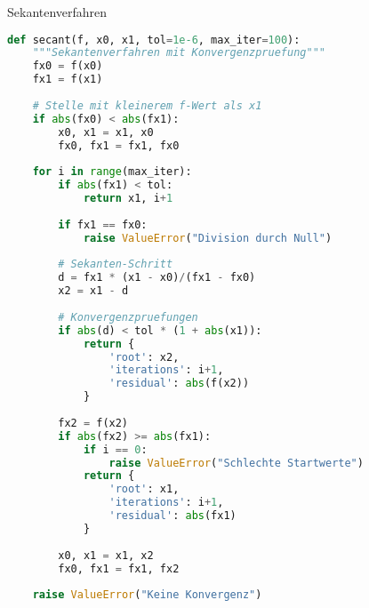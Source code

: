 \begin{examplecode}{Sekantenverfahren}
\begin{lstlisting}[language=Python, style=basesmol]
def secant(f, x0, x1, tol=1e-6, max_iter=100):
    """Sekantenverfahren mit Konvergenzpruefung"""
    fx0 = f(x0)
    fx1 = f(x1)
    
    # Stelle mit kleinerem f-Wert als x1
    if abs(fx0) < abs(fx1):
        x0, x1 = x1, x0
        fx0, fx1 = fx1, fx0
    
    for i in range(max_iter):
        if abs(fx1) < tol:
            return x1, i+1
            
        if fx1 == fx0:
            raise ValueError("Division durch Null")
            
        # Sekanten-Schritt
        d = fx1 * (x1 - x0)/(fx1 - fx0)
        x2 = x1 - d
        
        # Konvergenzpruefungen
        if abs(d) < tol * (1 + abs(x1)):
            return {
                'root': x2,
                'iterations': i+1,
                'residual': abs(f(x2))
            }
            
        fx2 = f(x2)
        if abs(fx2) >= abs(fx1):
            if i == 0:
                raise ValueError("Schlechte Startwerte")
            return {
                'root': x1,
                'iterations': i+1,
                'residual': abs(fx1)
            }
            
        x0, x1 = x1, x2
        fx0, fx1 = fx1, fx2
        
    raise ValueError("Keine Konvergenz")
\end{lstlisting}
\end{examplecode}

